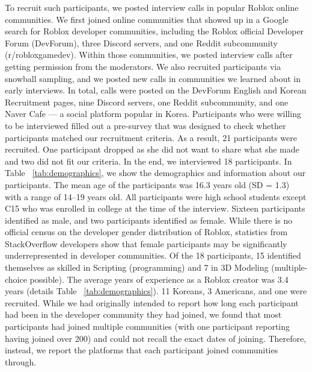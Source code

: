 To recruit such participants, we posted interview calls in popular Roblox online communities. We first joined online communities that showed up in a Google search for Roblox developer communities, including the Roblox official Developer Forum (DevForum), three Discord servers, and one Reddit subcommunity (r/robloxgamedev). Within those communities, we posted interview calls after getting permission from the moderators. We also recruited participants via snowball sampling, and we posted new calls in communities we learned about in early interviews. In total, calls were posted on the DevForum English and Korean Recruitment pages, nine Discord servers, one Reddit subcommunity, and one Naver Cafe --- a social platform popular in Korea. Participants who were willing to be interviewed filled out a pre-survey that was designed to check whether participants matched our recruitment criteria. As a result, 21 participants were recruited. One participant dropped as she did not want to share what she made and two did not fit our criteria. In the end, we interviewed 18 participants. 
In Table ~\ref{tab:demographics}, we show the demographics and information about our participants. The mean age of the participants was 16.3 years old (SD = 1.3) with a range of 14--19 years old. All participants were high school students except C15 who was enrolled in college at the time of the interview. Sixteen participants identified as male, and two participants identified as female. While there is no official census on the developer gender distribution of Roblox, statistics from StackOverflow developers show that female participants may be significantly underrepresented in developer communities. Of the 18 participants, 15 identified themselves as skilled in Scripting (programming) and 7 in 3D Modeling (multiple-choice possible). The average years of experience as a Roblox creator was 3.4 years (details  Table ~\ref{tab:demographics}). 11 Koreans, 3 Americans, and one  were recruited. While we had originally intended to report how long each participant had been in the developer community they had joined, we found that most participants had joined multiple communities (with one participant reporting having joined over 200) and could not recall the exact dates of joining. Therefore, instead, we report the platforms that each participant joined communities through.


